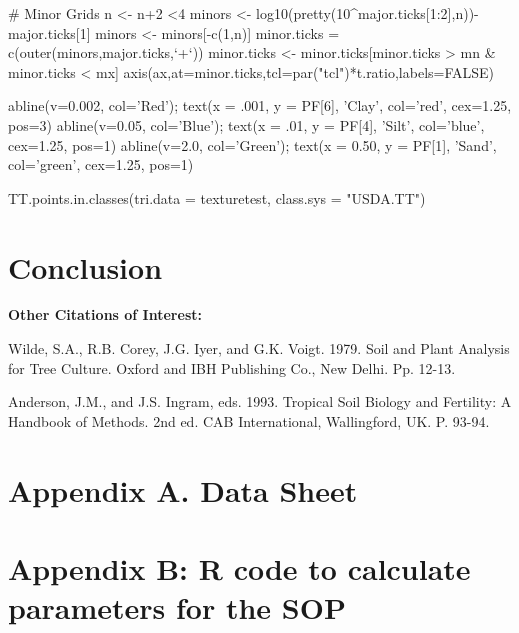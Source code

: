 \documentclass{tufte-handout}
\begin{document}
# Minor Grids
n <- n+2 <4
minors <- log10(pretty(10^major.ticks[1:2],n))-major.ticks[1]
minors <- minors[-c(1,n)]
minor.ticks = c(outer(minors,major.ticks,`+`))
minor.ticks <- minor.ticks[minor.ticks > mn & minor.ticks < mx]
axis(ax,at=minor.ticks,tcl=par("tcl")*t.ratio,labels=FALSE)

abline(v=0.002, col='Red'); text(x = .001, y = PF[6], 'Clay', col='red', cex=1.25, pos=3)
abline(v=0.05, col='Blue'); text(x = .01, y = PF[4], 'Silt', col='blue', cex=1.25, pos=1)
abline(v=2.0, col='Green'); text(x = 0.50, y = PF[1], 'Sand', col='green', cex=1.25, pos=1)



TT.points.in.classes(tri.data = texturetest, class.sys = "USDA.TT") 

\section{Conclusion}



\FloatBarrier 
\begin{fullwidth}




\medskip
\noindent \textbf{Other Citations of Interest:} 

Wilde, S.A., R.B. Corey, J.G. Iyer, and G.K. Voigt.  1979.  Soil and Plant Analysis for Tree Culture.  Oxford and IBH Publishing Co., New Delhi.  Pp. 12-13.

Anderson, J.M., and J.S. Ingram, eds.  1993.  Tropical Soil Biology and Fertility:  A Handbook of Methods. 2nd ed.  CAB International, Wallingford, UK.  P. 93-94.

\end{fullwidth}


\newpage
\thispagestyle{empty}
\section{Appendix A. Data Sheet}
\begin{fullwidth}

\end{fullwidth}


\newpage
\section{Appendix B: R code to calculate parameters for the SOP}
\end{document}

